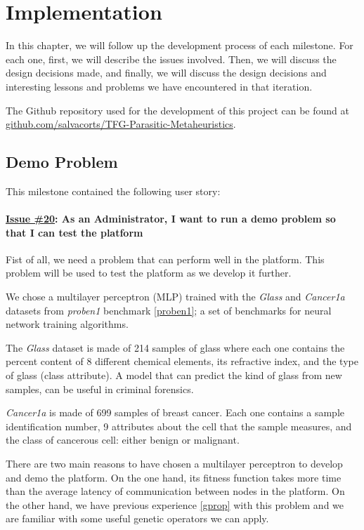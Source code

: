 \chapter{Implementation}
In this chapter, we will follow up the development process of each milestone. For each one, first, we will describe the issues involved. Then, we will discuss the design decisions made, and finally, we will discuss the design decisions and interesting lessons and problems we have encountered in that iteration.

The Github repository used for the development of this project can be found at \href{https://github.com/salvacorts/TFG-Parasitic-Metaheuristics}{github.com/salvacorts/TFG-Parasitic-Metaheuristics}.

\section{Demo Problem}
This milestone contained the following user story:

\subsubsection*{\href{https://github.com/salvacorts/TFG-Parasitic-Metaheuristics/issues/20}{Issue \#20}: As an Administrator, I want to run a demo problem so that I can test the platform} 

Fist of all, we need a problem that can perform well in the platform. This problem will be used to test the platform as we develop it further.

We chose a multilayer perceptron (MLP) trained with the \textit{Glass} and \textit{Cancer1a} datasets from \textit{proben1} benchmark \ref{proben1}; a set of benchmarks for neural network training algorithms.

The \textit{Glass} dataset is made of 214 samples of glass where each one contains the percent content of 8 different chemical elements, its refractive index, and the type of glass (class attribute). A model that can predict the kind of glass from new samples, can be useful in criminal forensics.

\textit{Cancer1a} is made of 699 samples of breast cancer. Each one contains a sample identification number, 9 attributes about the cell that the sample measures, and the class of cancerous cell: either benign or malignant.

There are two main reasons to have chosen a multilayer perceptron to develop and demo the platform. On the one hand, its fitness function takes more time than the average latency of communication between nodes in the platform. On the other hand, we have previous experience \ref{gprop} with this problem and we are familiar with some useful genetic operators we can apply.

